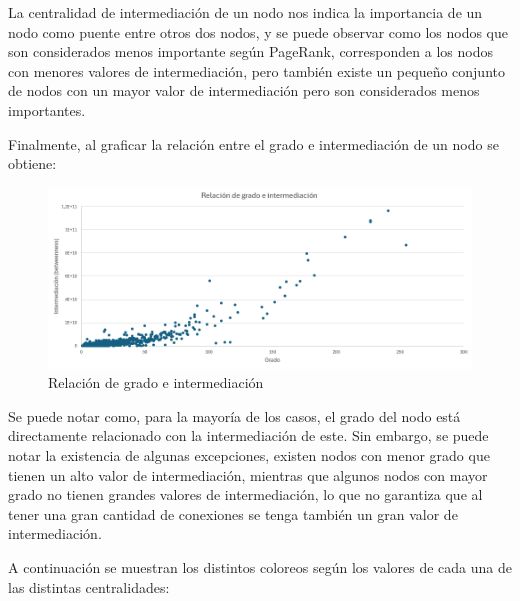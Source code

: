 \documentclass[12pt]{article}
\begin{document}
La centralidad de intermediación de un nodo nos indica la importancia de un nodo como puente entre otros dos nodos, y se puede observar como los nodos que son considerados menos importante según PageRank, corresponden a los nodos con menores valores de intermediación, pero también existe un pequeño conjunto de nodos con un mayor valor de intermediación pero son considerados menos importantes.

Finalmente, al graficar la relación entre el grado e intermediación de un nodo se obtiene:

\begin{figure}[H]
    \begin{center}
        \includegraphics[scale=0.6]{images/distribucion_grado_betweenness.png}
    \end{center}
    \caption{Relación de grado e intermediación}
    \label{fig:distribution-degree-betweenness}
\end{figure}

Se puede notar como, para la mayoría de los casos, el grado del nodo está directamente relacionado con la intermediación de este. Sin embargo, se puede notar la existencia de algunas excepciones, existen nodos con menor grado que tienen un alto valor de intermediación, mientras que algunos nodos con mayor grado no tienen grandes valores de intermediación, lo que no garantiza que al tener una gran cantidad de conexiones se tenga también un gran valor de intermediación.

A continuación se muestran los distintos coloreos según los valores de cada una de las distintas centralidades:
\end{document}
